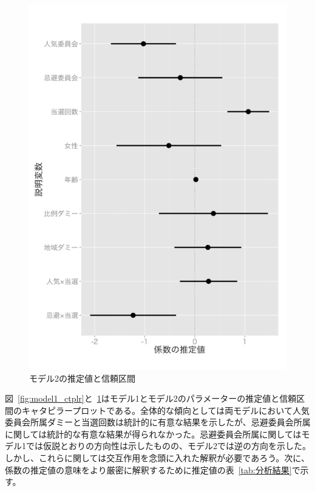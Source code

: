\documentclass[12pt, a4j]{jsarticle}
\begin{document}
\begin{figure}[htbp]
\begin{minipage}{0.4\columnwidth}
		\includegraphics[width=\columnwidth]{0_figs/model2_ctplr.pdf}
		\caption{モデル2の推定値と信頼区間} \label{fig:model2_ctplr}
	
	\end{minipage}
\end{figure}

図~\ref{fig:model1_ctplr}と~\ref{fig:model2_ctplr}はモデル1とモデル2のパラメーターの推定値と信頼区間のキャタピラープロットである。全体的な傾向としては両モデルにおいて人気委員会所属ダミーと当選回数は統計的に有意な結果を示したが、忌避委員会所属に関しては統計的な有意な結果が得られなかった。忌避委員会所属に関してはモデル1では仮説とおりの方向性は示したものの、モデル2では逆の方向を示した。しかし、これらに関しては交互作用を念頭に入れた解釈が必要であろう。次に、係数の推定値の意味をより厳密に解釈するために推定値の表~\ref{tab:分析結果}で示す。\par
\end{document}
